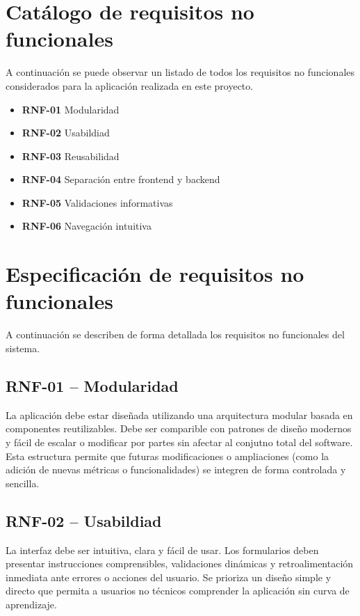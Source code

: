 \section{Catálogo de requisitos no funcionales}

A continuación se puede observar un listado de todos los requisitos no funcionales considerados para la aplicación realizada en este proyecto.

\begin{itemize}
    \item \textbf{RNF-01} Modularidad

    \item \textbf{RNF-02} Usabildiad

    \item \textbf{RNF-03} Reusabilidad

    \item \textbf{RNF-04} Separación entre frontend y backend

    \item \textbf{RNF-05} Validaciones informativas

    \item \textbf{RNF-06} Navegación intuitiva
\end{itemize}

\section{Especificación de requisitos no funcionales}

A continuación se describen de forma detallada los requisitos no funcionales del sistema.

\subsection*{RNF-01 – Modularidad}
La aplicación debe estar diseñada utilizando una arquitectura modular basada en componentes reutilizables. Debe ser comparible con patrones de diseño modernos y fácil de escalar o modificar por partes sin afectar al conjutno total del software. Esta estructura permite que futuras modificaciones o ampliaciones (como la adición de nuevas métricas o funcionalidades) se integren de forma controlada y sencilla.

\subsection*{RNF-02 – Usabildiad}
La interfaz debe ser intuitiva, clara y fácil de usar. Los formularios deben presentar instrucciones comprensibles, validaciones dinámicas y retroalimentación inmediata ante errores o acciones del usuario. Se prioriza un diseño simple y directo que permita a usuarios no técnicos comprender la aplicación sin curva de aprendizaje.

